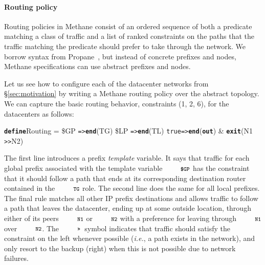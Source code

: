 \documentclass[numbers, 10pt, preprint]{sigplanconf}
\newcommand{\IE}{\emph{i.e.}}
\newcommand{\sysname}{{\small \sf Methane}\xspace}
\newcommand{\para}[1]{\paragraph*{\textbf{#1}}}
\newcommand{\CD}[1]{\texttt{\small #1}}  %
\newcommand{\KW}[1]{\texttt{\small\bfseries{#1}}}
\newcommand{\True}{\CD{true}}
\newcommand{\Define}{\KW{define}}
\newcommand{\Prefer}{\texttt{>>}}
\newcommand{\Path}{\texttt{=>}}
\newcommand{\Out}{\KW{out}}
\newcommand{\Exit}{\KW{exit}}
\newcommand{\End}{\KW{end}}
\begin{document}
%


\para{Routing policy} Routing policies in \sysname consist of an ordered sequence of both a predicate matching a class of traffic and a list of ranked constraints on the paths that the traffic matching the predicate should prefer to take through the network. We borrow syntax from Propane~\cite{propane}, but instead of concrete prefixes and nodes, \sysname specifications can use abstract prefixes and nodes.

Let us see how to configure each of the datacenter networks from \S\ref{sec:motivation} by writing a \sysname routing policy over the abstract topology. We can capture the basic routing behavior, constraints (1, 2, 6), for the datacenters as follows:
%
\begin{code}
\Define Routing =
    \$GP  \Path \End(TG)
    \$LP  \Path \End(TL)
    \True \Path \End(\Out) & \Exit(N1 \Prefer N2)
\end{code}
\noindent%

The first line introduces a prefix \emph{template} variable. It says that traffic for each global prefix associated with the template variable $\CD{\$GP}$ has the constraint that it should follow a path that ends at its corresponding destination router contained in the $\CD{TG}$ role. The second line does the same for all local prefixes.
%
The final rule matches all other IP prefix destinations and allows traffic to follow a path that leaves the datacenter, ending up at some outside location, through either of its peers $\CD{N1}$ or $\CD{N2}$ with a preference for leaving through $\CD{N1}$ over $\CD{N2}$. The $\CD{\Prefer}$~symbol indicates that traffic should satisfy the constraint on the left whenever possible (\IE, a path exists in the network), and only resort to the backup (right) when this is not possible due to network failures.%
\end{document}
